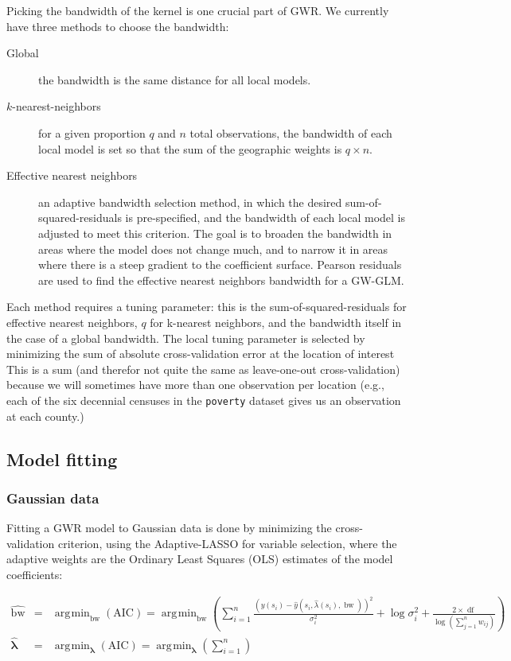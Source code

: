 \documentclass[authoryear ,review]{elsarticle}
\DeclareMathOperator*{\argmin}{\arg\!\min}
\DeclareMathOperator*{\bw}{\mbox{bw}}
\DeclareMathOperator*{\df}{\mbox{df}}
\newcommand{\vect}[1]{\boldsymbol{#1}}
\begin{document}
		Picking the bandwidth of the kernel is one crucial part of GWR. We currently have three methods to choose the bandwidth:
		\begin{description}
			\item[Global] the bandwidth is the same distance for all local models.
			\item[$k$-nearest-neighbors] for a given proportion $q$ and $n$ total observations, the bandwidth of each local model is set so that the sum of the geographic weights is $q \times n$.
			\item[Effective nearest neighbors] an adaptive bandwidth selection method, in which the desired sum-of-squared-residuals is pre-specified, and the bandwidth of each local model is adjusted to meet this criterion. The goal is to broaden the bandwidth in areas where the model does not change much, and to narrow it in areas where there is a steep gradient to the coefficient surface. Pearson residuals are used to find the effective nearest neighbors bandwidth for a GW-GLM.
		\end{description}
		
		Each method requires a tuning parameter: this is the sum-of-squared-residuals for effective nearest neighbors, $q$ for k-nearest neighbors, and the bandwidth itself in the case of a global bandwidth. The local tuning parameter is selected by minimizing the sum of absolute cross-validation error at the location of interest This is a sum (and therefor not quite the same as leave-one-out cross-validation) because we will sometimes have more than one observation per location (e.g., each of the six decennial censuses in the \verb~poverty~ dataset gives us an observation at each county.)\\
		
		
	\subsection{Model fitting}
		\subsubsection{Gaussian data}
		Fitting a GWR model to Gaussian data is done by minimizing the cross-validation criterion, using the Adaptive-LASSO for variable selection, where the adaptive weights are the Ordinary Least Squares (OLS) estimates of the model coefficients:

		 \begin{eqnarray*}
			\hat{\bw} &=& \argmin_{\text{bw}} \left( \mbox{AIC} \right)  = \argmin_{\text{bw}} \left( \sum_{i = 1}^n \frac{ \left(y(s_i)-\hat{y}\left(s_i, \hat{\lambda}(s_i), \bw \right) \right)^2 }{\sigma_i^2} + \log{\sigma_i^2} + \frac{2 \times \df}{\log{ \left(\sum_{j=1}^n w_{ij} \right) }} \right)\\	
			\hat{\vect{\lambda}} &=& \argmin_{\vect{\lambda}} \left( \mbox{AIC} \right)  = \argmin_{\vect{\lambda}} \left( \sum_{i = 1}^n \right) 
		\end{eqnarray*}
		
\end{document}
